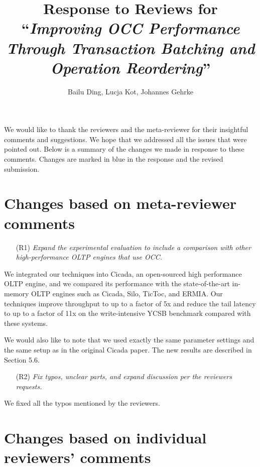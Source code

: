 \documentclass{article}
\newcommand{\changed}[1]{#1}
\newcommand{\changed}[1]{{\color{blue}#1}}
\begin{document}
\title{Response to Reviews for ``\emph{Improving OCC Performance Through Transaction Batching and Operation Reordering}''}
\author{Bailu Ding, Lucja Kot, Johannes Gehrke}
\date{}
\maketitle

We would like to thank the reviewers and the meta-reviewer for their insightful comments and suggestions. We hope that we addressed all the issues that were pointed out. Below is a summary of the changes we made in response to these comments. Changes are marked in blue in the response and the revised submission.

\section{Changes based on meta-reviewer comments}


\begin{itemize}
	\item[(R1)] \emph{Expand the experimental evaluation to include a comparison with other high-performance OLTP engines that use OCC.}
\end{itemize}

\changed{
We integrated our techniques into Cicada, an open-sourced high performance OLTP engine, and we compared its performance with the state-of-the-art in-memory OLTP engines such as Cicada, Silo, TicToc, and ERMIA. Our techniques improve throughput to up to a factor of 5x and reduce the tail latency to up to a factor of 11x on the write-intensive YCSB benchmark compared with these systems.

We would also like to note that we used exactly the same parameter settings and the same setup as in the original Cicada paper. The new results are described in Section 5.6.
}

\begin{itemize}
	\item[(R2)] \emph{Fix typos, unclear parts, and expand discussion per the reviewers requests.}
\end{itemize}

\changed{
	We fixed all the typos mentioned by the reviewers.
}

\section{Changes based on individual reviewers' comments}
\end{document}
